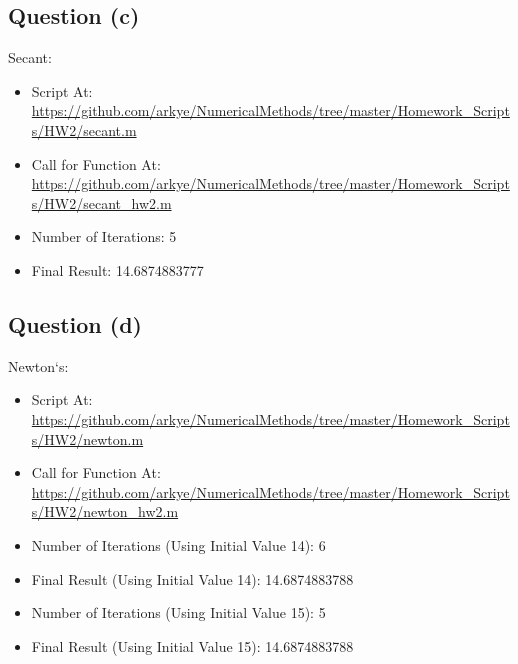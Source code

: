 	\subsection{Question (c)}

		Secant:

		\begin{itemize} 
		 	\item{Script At: \url{https://github.com/arkye/NumericalMethods/tree/master/Homework_Scripts/HW2/secant.m}}
		 	\item{Call for Function At: \url{https://github.com/arkye/NumericalMethods/tree/master/Homework_Scripts/HW2/secant_hw2.m}}
		 	\item{Number of Iterations: 5}
		 	\item{Final Result: 14.6874883777}
		\end{itemize}

	\subsection{Question (d)}
		
		Newton`s:

		\begin{itemize} 
		 	\item{Script At: \url{https://github.com/arkye/NumericalMethods/tree/master/Homework_Scripts/HW2/newton.m}}
		 	\item{Call for Function At: \url{https://github.com/arkye/NumericalMethods/tree/master/Homework_Scripts/HW2/newton_hw2.m}}
		 	\item{Number of Iterations (Using Initial Value 14): 6}
			\item{Final Result (Using Initial Value 14): 14.6874883788}
			\item{Number of Iterations (Using Initial Value 15): 5}
		 	\item{Final Result (Using Initial Value 15): 14.6874883788}
		\end{itemize}
